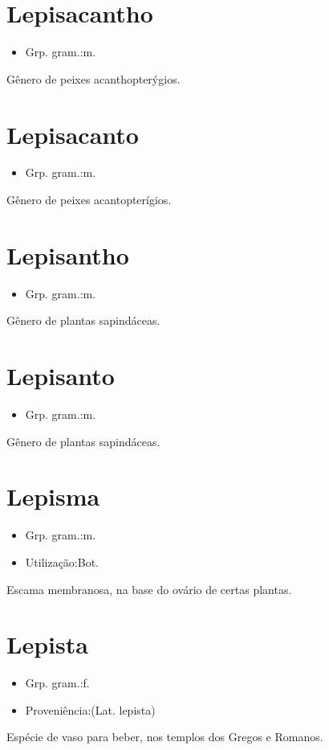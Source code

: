 \section{Lepisacantho}
\begin{itemize}
\item {Grp. gram.:m.}
\end{itemize}
Gênero de peixes acanthopterýgios.
\section{Lepisacanto}
\begin{itemize}
\item {Grp. gram.:m.}
\end{itemize}
Gênero de peixes acantopterígios.
\section{Lepisantho}
\begin{itemize}
\item {Grp. gram.:m.}
\end{itemize}
Gênero de plantas sapindáceas.
\section{Lepisanto}
\begin{itemize}
\item {Grp. gram.:m.}
\end{itemize}
Gênero de plantas sapindáceas.
\section{Lepisma}
\begin{itemize}
\item {Grp. gram.:m.}
\end{itemize}
\begin{itemize}
\item {Utilização:Bot.}
\end{itemize}
Escama membranosa, na base do ovário de certas plantas.
\section{Lepista}
\begin{itemize}
\item {Grp. gram.:f.}
\end{itemize}
\begin{itemize}
\item {Proveniência:(Lat. \textunderscore lepista\textunderscore )}
\end{itemize}
Espécie de vaso para beber, nos templos dos Gregos e Romanos.
